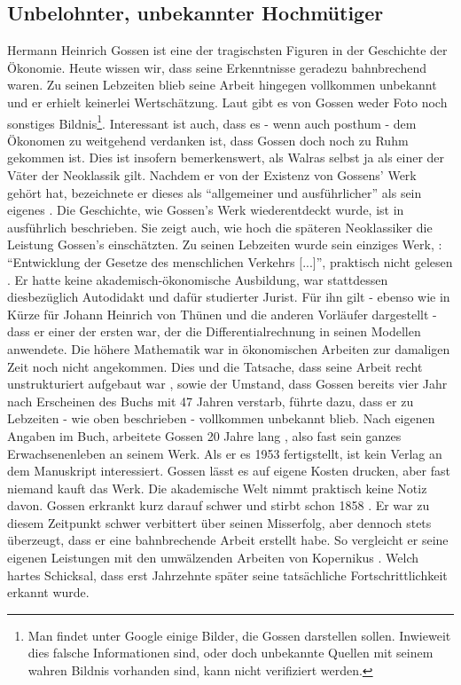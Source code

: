 \subsection{Unbelohnter, unbekannter Hochmütiger}

Hermann Heinrich Gossen ist eine der tragischsten Figuren in der Geschichte der Ökonomie. Heute wissen wir, dass seine Erkenntnisse geradezu bahnbrechend waren. Zu seinen Lebzeiten blieb seine Arbeit hingegen vollkommen unbekannt und er erhielt keinerlei Wertschätzung. Laut \textcite{Kurz2009} gibt es von Gossen weder Foto noch sonstiges Bildnis\footnote{Man findet unter Google einige Bilder, die Gossen darstellen sollen. Inwieweit dies falsche Informationen sind, oder doch unbekannte Quellen mit seinem wahren Bildnis vorhanden sind, kann nicht verifiziert werden.}. Interessant ist auch, dass es - wenn auch posthum - dem Ökonomen \textcite{Walras1885} zu weitgehend verdanken ist, dass Gossen doch noch zu Ruhm gekommen ist. Dies ist insofern bemerkenswert, als Walras selbst ja als einer der Väter der Neoklassik gilt. Nachdem er von der Existenz von Gossens' Werk gehört hat, bezeichnete er dieses als "`allgemeiner und ausführlicher"' als sein eigenes \parencite[S. 1]{Kurz2009}. Die Geschichte, wie Gossen's Werk wiederentdeckt wurde, ist in \textcite{Ikeda2000} ausführlich beschrieben. Sie zeigt auch, wie hoch die späteren Neoklassiker die Leistung Gossen's einschätzten.
Zu seinen Lebzeiten wurde sein einziges Werk, \textcite{Gossen1854}: "`Entwicklung der Gesetze des menschlichen Verkehrs [...]"', praktisch nicht gelesen \parencite[S. 282]{Rosner2012}. Er hatte keine akademisch-ökonomische Ausbildung, war stattdessen diesbezüglich Autodidakt \parencite[S. 3]{Kurz2009} und dafür studierter Jurist. Für ihn gilt - ebenso wie in Kürze für Johann Heinrich von Thünen und die anderen Vorläufer dargestellt - dass er einer der ersten war, der die Differentialrechnung in seinen Modellen anwendete. Die höhere Mathematik war in ökonomischen Arbeiten zur damaligen Zeit noch nicht angekommen. Dies und die Tatsache, dass seine Arbeit \parencite{Gossen1854} recht unstrukturiert aufgebaut war \parencite[S. 20]{Kurz2009}, sowie der Umstand, dass Gossen bereits vier Jahr nach Erscheinen des Buchs mit 47 Jahren verstarb, führte dazu, dass er zu Lebzeiten - wie oben beschrieben - vollkommen unbekannt blieb. Nach eigenen Angaben im Buch, arbeitete Gossen 20 Jahre lang \parencite[S. 3]{Kurz2009}, also fast sein ganzes Erwachsenenleben an seinem Werk. Als er es 1953 fertigstellt, ist kein Verlag an dem Manuskript interessiert. Gossen lässt es auf eigene Kosten drucken, aber fast niemand kauft das Werk. Die akademische Welt nimmt praktisch keine Notiz davon. Gossen erkrankt kurz darauf schwer und stirbt schon 1858 \parencite[S.4]{Kurz2009}. Er war zu diesem Zeitpunkt schwer verbittert über seinen Misserfolg, aber dennoch stets überzeugt, dass er eine bahnbrechende Arbeit erstellt habe. So vergleicht er seine eigenen Leistungen mit den umwälzenden Arbeiten von Kopernikus \parencite{Kurz2009, Gossen1854}. Welch hartes Schicksal, dass erst Jahrzehnte später seine tatsächliche Fortschrittlichkeit erkannt wurde.

